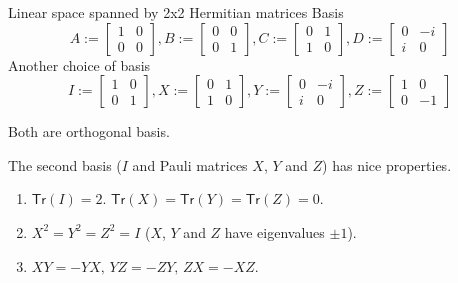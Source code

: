 \documentclass{beamer}
\newcommand{\Tr}{\mathsf{Tr}}
\theoremstyle{definition}
\begin{document}
\begin{frame}{Linear space spanned by 2x2 Hermitian matrices}
Basis
\begin{equation*}
A:=
\begin{bmatrix}
1&0\\
0&0
\end{bmatrix}
,
B:=
\begin{bmatrix}
0&0\\
0&1
\end{bmatrix}
,
C:=
\begin{bmatrix}
0&1\\
1&0
\end{bmatrix}
,
D:=
\begin{bmatrix}
0&-i\\
i&0
\end{bmatrix}
\end{equation*}
Another choice of basis
\begin{equation*}
I:=
\begin{bmatrix}
1&0\\
0&1
\end{bmatrix}
,
X:=
\begin{bmatrix}
0&1\\
1&0
\end{bmatrix}
,
Y:=
\begin{bmatrix}
0&-i\\
i&0
\end{bmatrix}
,
Z:=
\begin{bmatrix}
1&0\\
0&-1
\end{bmatrix}
\end{equation*}

Both are orthogonal basis.

The second basis ($I$ and Pauli matrices $X$, $Y$ and $Z$) has nice properties.
\begin{enumerate}
\item $\Tr(I)=2$. $\Tr(X)=\Tr(Y)=\Tr(Z)=0$.
\item $X^2 = Y^2 = Z^2 = I$ ($X$, $Y$ and $Z$ have eigenvalues $\pm 1$).
\item $XY=-YX,\,YZ=-ZY,\,ZX=-XZ$.
\end{enumerate}
\end{frame}
\end{document}
